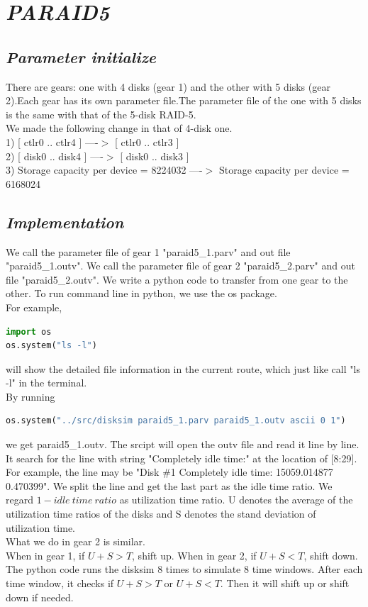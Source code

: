 \documentclass[conference]{IEEEtran}
\begin{document}
\section{\emph{\textbf{PARAID5}}}
\subsection{\emph{\textbf{Parameter initialize}}}
There are gears: one with 4 disks (gear 1) and the other with 5 disks (gear 2).Each gear has its own parameter file.The parameter file of the one with 5 disks is the same with that of the 5-disk RAID-5.\\
We made the following change in that of 4-disk one.\\
1)  [ ctlr0 .. ctlr4 ] ----$>$  [ ctlr0 .. ctlr3 ]\\
2) [ disk0 .. disk4 ] ----$>$ [ disk0 .. disk3 ]\\
3) Storage capacity per device  =  8224032  ----$>$ Storage capacity per device  =  6168024\\
\subsection{\emph{\textbf{Implementation}}}
We call the parameter file of gear 1 "paraid5\_1.parv" and out file "paraid5\_1.outv". We call the parameter file of gear 2 "paraid5\_2.parv" and out file "paraid5\_2.outv". We write a python code to transfer from one gear to the other. To run command line in python, we use the os package.\\
For example,
\lstset{flexiblecolumns,showstringspaces=false,numbers=left,numberstyle=\footnotesize,frame=single,breaklines=ture}
\begin{lstlisting}[language=Python]
import os
os.system("ls -l")
\end{lstlisting} 
will show the detailed file information in the current route, which just like call "ls -l" in the terminal.\\
By running
\begin{lstlisting}[language=Python]
os.system("../src/disksim paraid5_1.parv paraid5_1.outv ascii 0 1")
\end{lstlisting}
we get paraid5\_1.outv. The srcipt will open the outv file and read it line by line. It search for the line with string "Completely idle time:" at the location of [8:29]. For example, the line may be "Disk \#1 Completely idle time:  	15059.014877   	0.470399". We split the line and get the last part as the idle time ratio. We regard $1-idle\ time\ ratio$ as utilization time ratio. U denotes the average of the utilization time ratios of the disks and S denotes the stand deviation of utilization time.\\
What we do in gear 2 is similar.\\
When in gear 1, if $U+S>T$, shift up. When in gear 2, if $U+S<T$, shift down.\\
The python code runs the disksim 8 times to simulate 8 time windows. After each time window, it checks if $U+S>T$ or $U+S<T$. Then it will shift up or shift down if needed.
\end{document}
